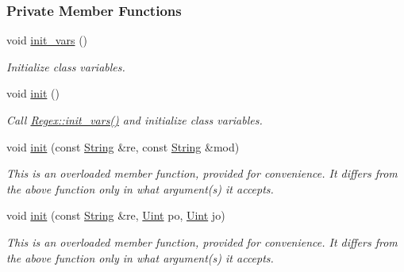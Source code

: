 \subsubsection*{Private Member Functions}
\begin{DoxyCompactItemize}
\item 
\hypertarget{classjpcre2_1_1Regex_aff1f5cd95b6ac227014e7a5265a50cc0}{}\label{classjpcre2_1_1Regex_aff1f5cd95b6ac227014e7a5265a50cc0} 
void \hyperlink{classjpcre2_1_1Regex_aff1f5cd95b6ac227014e7a5265a50cc0}{init\+\_\+vars} ()
\begin{DoxyCompactList}\small\item\em Initialize class variables. \end{DoxyCompactList}\item 
void \hyperlink{classjpcre2_1_1Regex_a6df564d3dec70bbeec65de125c7d4de2_a6df564d3dec70bbeec65de125c7d4de2}{init} ()
\begin{DoxyCompactList}\small\item\em Call \hyperlink{classjpcre2_1_1Regex_aff1f5cd95b6ac227014e7a5265a50cc0}{Regex\+::init\+\_\+vars()} and initialize class variables. \end{DoxyCompactList}\item 
void \hyperlink{classjpcre2_1_1Regex_aedc5f414e5fa401e1a91614cfab0b033_aedc5f414e5fa401e1a91614cfab0b033}{init} (const \hyperlink{namespacejpcre2_a91f03070152fb228bc116c5a737f1d16}{String} \&re, const \hyperlink{namespacejpcre2_a91f03070152fb228bc116c5a737f1d16}{String} \&mod)
\begin{DoxyCompactList}\small\item\em This is an overloaded member function, provided for convenience. It differs from the above function only in what argument(s) it accepts. \end{DoxyCompactList}\item 
void \hyperlink{classjpcre2_1_1Regex_adbda074677e393438452190e55a971d0_adbda074677e393438452190e55a971d0}{init} (const \hyperlink{namespacejpcre2_a91f03070152fb228bc116c5a737f1d16}{String} \&re, \hyperlink{namespacejpcre2_a078242d38221a13fb3543b9edd78c099}{Uint} po, \hyperlink{namespacejpcre2_a078242d38221a13fb3543b9edd78c099}{Uint} jo)
\begin{DoxyCompactList}\small\item\em This is an overloaded member function, provided for convenience. It differs from the above function only in what argument(s) it accepts. \end{DoxyCompactList}\item 

\end{DoxyCompactItemize}
